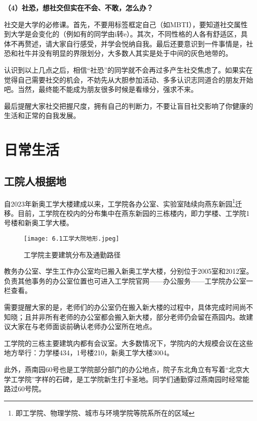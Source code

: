 \documentclass[11pt,oneside]{book}
\begin{document}
\textbf{（4）社恐，想社交但实在不会、不敢，怎么办？}

社交是大学的必修课。首先，不要用标签框定自己（如MBTI），要知道社交属性到大学是会变化的（例如有的同学由i转e）。其次，不同性格的人各有舒适区，具体不再赘述，请大家自行感受，并学会悦纳自我。最后还要意识到一件事情是，社恐和社牛并没有明显的界限划分，大多数人其实是处于中间的灰色地带的。

认识到以上几点之后，相信“社恐”的同学就不会再过多产生社交焦虑了。如果实在觉得自己需要社交的机会，不妨先从大胆参加活动、多多认识志同道合的朋友开始吧。当然，最终能不能成为朋友很多时候是看缘分，强求不来。

最后提醒大家社交把握尺度，拥有自己的判断力，不要让盲目社交影响了你健康的生活和正常的自我发展。




\chapter{日常生活}

\section{工院人根据地}

自2023年新奥工学大楼建成以来，工学院各办公室、实验室陆续向燕东新园\footnote{即工学院、物理学院、城市与环境学院等院系所在的区域}迁移。目前，工学院在校内的分布集中在燕东新园的三栋楼内，即力学楼、工学院1号楼和新奥工学大楼。

\begin{figure}[htbp]
	\centering
	\texttt{[image: 6.1工学大院地形.jpeg]}
	\renewcommand{\figurename}{图}
	\caption{工学院主要建筑分布及通勤路径}
	\label{fig:enter-label}
\end{figure}

教务办公室、学生工作办公室均已搬入新奥工学大楼，分别位于2005室和2012室。负责其他事务的办公室位置也可进入工学院官网——办公服务——工学院办公室一栏查看。

需要提醒大家的是，老师们的办公室仍在搬入新大楼的过程中，具体完成时间尚不知晓；且并非所有老师的办公室都会搬入新大楼，部分老师仍会留在燕园内。故建议大家在与老师面谈前确认老师办公室所在地点。

工学院的三栋主要建筑内都有会议室。大多数情况下，学院内的大规模会议在这些地方举行：力学楼434，1号楼210，新奥工学大楼3004。

此外，燕南园60号也是工学院部分部门的办公地点，院子东北角立有写着“北京大学工学院”字样的石碑，是工学院新生打卡圣地。同学们通勤穿过燕南园时经常能路过60号院。
\end{document}
